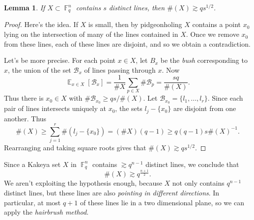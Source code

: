 \documentclass{article}
\DeclareMathOperator{\FF}{\mathbb{F}}
\DeclareMathOperator{\EE}{\mathbb{E}}
\theoremstyle{plain}
\newtheorem{lemma}[theorem]{Lemma}
\theoremstyle{definition}
\begin{document}
\begin{lemma}
    If $X \subset \FF_q^n$ contains $s$ distinct lines, then $\#(X) \gtrsim qs^{1/2}$.
\end{lemma}
\begin{proof}
    Here's the idea. If $X$ is small, then by pidgeonholing $X$ contains a point $x_0$ lying on the intersection of many of the lines contained in $X$. Once we remove $x_0$ from these lines, each of these lines are disjoint, and so we obtain a contradiction.

    Let's be more precise. For each point $x \in X$, let $B_x$ be the \emph{bush} corresponding to $x$, the union of the set $\mathcal{B}_x$ of lines passing through $x$. Now
    \[ \EE_{x \in X} [ \mathcal{B}_x ] = \frac{1}{\# X} \sum_{p \in X} \# \mathcal{B}_p = \frac{sq}{\#(X)}.  \]
    Thus there is $x_0 \in X$ with $\# \mathcal{B}_{x_0} \geq qs / \#(X)$. Let $\mathcal{B}_{x_0} = \{ l_1, \dots, l_r \}$. Since each pair of lines intersects uniquely at $x_0$, the sets $l_j - \{ x_0 \}$ are disjoint from one another. Thus
    \[ \#(X) \geq \sum_{j = 1}^r \#( l_j - \{ x_0 \} ) = (\#X)(q - 1) \geq q(q-1) s \#(X)^{-1}. \]
    Rearranging and taking square roots gives that $\#(X) \gtrsim q s^{1/2}$.
\end{proof}

Since a Kakeya set $X$ in $\FF_q^n$ contains $\gtrsim q^{n-1}$ distinct lines, we conclude that
%
\[ \#(X) \gtrsim q^{\frac{n+1}{2}}. \]
%
We aren't exploiting the hypothesis enough, because $X$ not only contains $q^{n-1}$ distinct lines, but these lines are also \emph{pointing in different directions}. In particular, at most $q + 1$ of these lines lie in a two dimensional plane, so we can apply the \emph{hairbrush method}.
\end{document}
